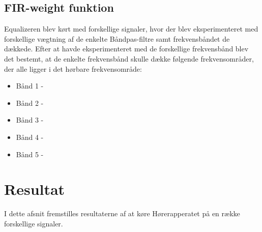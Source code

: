 \subsection{FIR-weight funktion}

Equalizeren blev kørt med forskellige signaler, hvor der blev eksperimenteret med forskellige vægtning af de enkelte Båndpas-filtre samt frekvensbåndet de dækkede. Efter at havde eksperimenteret med de forskellige frekvensbånd blev det bestemt, at de enkelte frekvensbånd skulle dække følgende frekvensområder, der alle ligger i det hørbare frekvensområde:
\begin{itemize}
	\item Bånd 1 -
	\item Bånd 2 -
	\item Bånd 3 -
	\item Bånd 4 -
	\item Bånd 5 -
\end{itemize}

\section{Resultat}
I dette afsnit fremstilles resultaterne af at køre Hørerapperatet på en række forskellige signaler.
